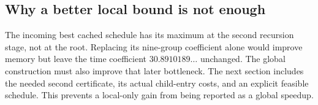\subsection{Why a better local bound is not enough}
The incoming best cached schedule has its maximum at the second recursion
stage, not at the root. Replacing its nine-group coefficient alone would
improve memory but leave the time coefficient $30.8910189\ldots$ unchanged.
The global construction must also improve that later bottleneck. The next
section includes the needed second certificate, its actual child-entry
costs, and an explicit feasible schedule. This prevents a local-only gain
from being reported as a global speedup.
